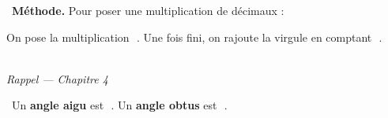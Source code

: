\documentclass[a4paper,11pt]{article}
\newcommand{\bl}[1][4cm]{\,\makebox[#1]{\dotfill}\,}
\newcommand{\coeur}{\textcolor{Couleur8}{\faHeart}\ }
\newcommand{\coeurrappel}{\textcolor{Couleur6}{\faHeart}\ }
\begin{document}
\noindent \coeur \textbf{M\'ethode.} Pour poser une multiplication de d\'ecimaux :
\begin{mdframed}[linecolor=Couleur1,linewidth=4pt,topline=false,bottomline=false,rightline=false,backgroundcolor=Couleur1!5,innerleftmargin=8pt,innertopmargin=6pt,innerbottommargin=6pt]
On pose la multiplication \bl[5cm]. Une fois fini, on rajoute la virgule en comptant \bl[6cm].
\end{mdframed}

\vspace{0.3cm}
\noindent{\textcolor{Couleur8}{\rule{\textwidth}{0.5pt}}}\\
{\small\textit{\textcolor{Couleur8}{Rappel --- Chapitre 4}}}
\vspace{0.1cm}

\noindent \coeurrappel Un \textbf{angle aigu} est \bl[4cm]. Un \textbf{angle obtus} est \bl[4cm].
\end{document}
